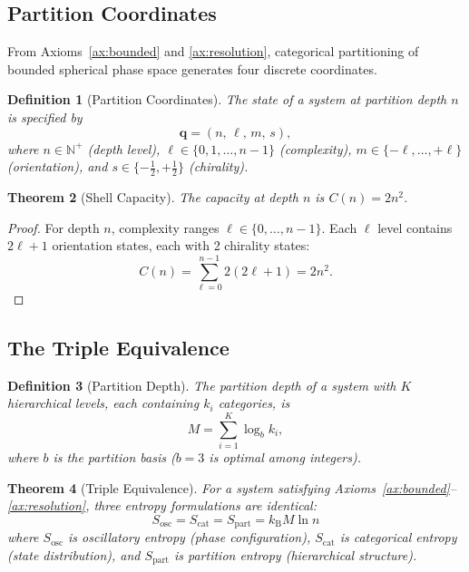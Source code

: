 \documentclass[twocolumn,10pt]{article}
\newtheorem{theorem}{Theorem}[section]
\newtheorem{definition}[theorem]{Definition}
\theoremstyle{remark}
\newcommand{\Sosc}{S_{\mathrm{osc}}}
\newcommand{\Scat}{S_{\mathrm{cat}}}
\newcommand{\Spart}{S_{\mathrm{part}}}
\newcommand{\kB}{k_{\mathrm{B}}}
\newcommand{\partition}[4]{(#1,\,#2,\,#3,\,#4)}
\begin{document}
\subsection{Partition Coordinates}

From Axioms~\ref{ax:bounded} and \ref{ax:resolution}, categorical partitioning of bounded spherical phase space generates four discrete coordinates.

\begin{definition}[Partition Coordinates]
\label{def:partition_coords}
The state of a system at partition depth $n$ is specified by
\begin{equation}
  \mathbf{q} = \partition{n}{\ell}{m}{s},
\end{equation}
where $n \in \mathbb{N}^+$ (depth level), $\ell \in \{0, 1, \ldots, n-1\}$ (complexity), $m \in \{-\ell, \ldots, +\ell\}$ (orientation), and $s \in \{-\frac{1}{2}, +\frac{1}{2}\}$ (chirality).
\end{definition}

\begin{theorem}[Shell Capacity]
\label{thm:capacity}
The capacity at depth $n$ is $C(n) = 2n^2$.
\end{theorem}

\begin{proof}
For depth $n$, complexity ranges $\ell \in \{0, \ldots, n-1\}$. Each $\ell$ level contains $2\ell + 1$ orientation states, each with 2 chirality states:
\begin{equation}
  C(n) = \sum_{\ell=0}^{n-1} 2(2\ell + 1) = 2n^2.
\end{equation}
\end{proof}

\subsection{The Triple Equivalence}

\begin{definition}[Partition Depth]
\label{def:depth}
The partition depth of a system with $K$ hierarchical levels, each containing $k_i$ categories, is
\begin{equation}
  M = \sum_{i=1}^{K} \log_b k_i,
\end{equation}
where $b$ is the partition basis ($b = 3$ is optimal among integers).
\end{definition}

\begin{theorem}[Triple Equivalence]
\label{thm:triple}
For a system satisfying Axioms~\ref{ax:bounded}--\ref{ax:resolution}, three entropy formulations are identical:
\begin{equation}
  \boxed{\Sosc = \Scat = \Spart = \kB M \ln n}
  \label{eq:triple}
\end{equation}
where $\Sosc$ is oscillatory entropy (phase configuration), $\Scat$ is categorical entropy (state distribution), and $\Spart$ is partition entropy (hierarchical structure).
\end{theorem}
\end{document}
